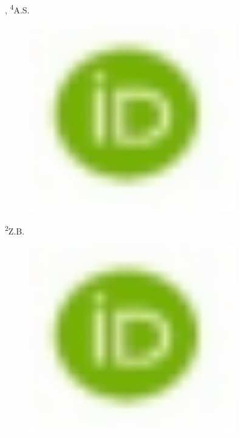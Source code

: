 , \textsuperscript{4}A.S.
\begin{figure}[H]
	\centering
	\includegraphics[width=0.8\textwidth]{media/chem2/image16}
	\caption*{}
\end{figure}

\textsuperscript{2}Z.B.
\begin{figure}[H]
	\centering
	\includegraphics[width=0.8\textwidth]{media/chem2/image16}
	\caption*{}
\end{figure}

